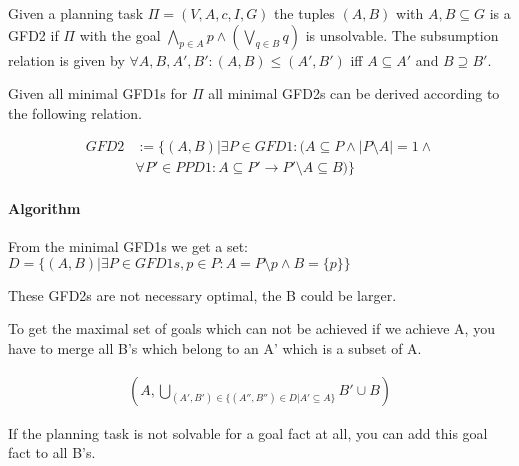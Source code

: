 \begin{definition}
	Given a planning task $\Pi = (V,A,c,I,G)$ the tuples
	$(A,B)$ with $A,B \subseteq G $ is a GFD2 if 
	$\Pi$ with the goal $\bigwedge_{p \in A} p \wedge (\bigvee_{q \in B} q)$
	is unsolvable. 
	The subsumption relation is given by $\forall A,B,A',B': (A,B) \leq (A',B')$ iff $A \subseteq A'$
	and $B \supseteq B'$.
\end{definition}	

	\noindent
	Given all minimal GFD1s for $\Pi$ all minimal GFD2s can be derived according 
	to the following relation.


	\vspace{-0.3cm}
	\begin{align*}
		GFD2 &:= \{(A,B) | 
				\exists P \in GFD1:(
				   A \subseteq P \wedge |P \setminus A | = 1 \wedge\\
				   &\forall P' \in PPD1:
					  A \subseteq P' \rightarrow P' \setminus A \subseteq B
				)
			 \}
	\end{align*}

\paragraph{Algorithm}
From the minimal GFD1s we get a set:
	$D = \{(A,B) | \exists P \in GFD1s, p \in P: A = P \setminus p \wedge
	B = \{p\}\}$

These GFD2s are not necessary optimal, the B could be larger.


\noindent
To get the maximal set of goals which can not be achieved if we achieve A, 
you have to merge all B's which belong to an A' which is a subset of A. 

\begin{align*}
	(A, \bigcup_{(A', B') \in \{(A'', B'') \in D | A' \subseteq A\}} B' \cup B)
\end{align*}



\noindent
If the planning task is not solvable for a goal fact at all, you can add 
this goal fact to all B's.\\
